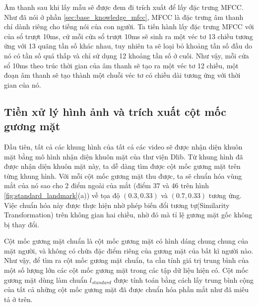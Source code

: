 Âm thanh sau khi lấy mẫu sẽ được đem đi trích xuất để lấy đặc trưng MFCC. Như đã nói ở phần \ref{sec:base_knowledge_mfcc}, MFCC là đặc trưng âm thanh chỉ dành riêng cho tiếng nói của con người. Ta tiến hành lấy đặc trưng MFCC với của sổ trượt 10ms, cứ mỗi cửa sổ trượt 10ms sẽ sinh ra một véc tơ 13 chiều tương ứng với 13 quãng tần số khác nhau, tuy nhiên ta sẽ loại bỏ khoảng tần số đầu do nó có tần số quá thấp và chỉ sử dụng 12 khoảng tần số ở cuối. Như vậy, mỗi cửa sổ 10ms theo trúc thời gian của âm thanh sẽ tạo ra một véc tơ 12 chiều, một đoạn âm thanh sẽ tạo thành một chuỗi véc tơ có chiều dài tương ứng với thời gian của nó.

\subsection{Tiền xử lý hình ảnh và trích xuất cột mốc gương mặt}\label{sec:preprocess_audio_lm}

Đầu tiên, tất cả các khung hình của tất cả các video sẽ được nhận diện khuôn mặt bằng mô hình nhận diện khuôn mặt của thư viện Dlib. Từ khung hình đã được nhận diện khuôn mặt này, ta dễ dàng tìm được cột mốc gương mặt trên từng khung hình. Với mỗi cột mốc gương mặt thu được, ta sẽ chuẩn hóa vùng mắt của nó sao cho 2 điểm ngoài của mắt (điểm 37 và 46 trên hình \ref{fig:standard_landmark}(a)) về tọa độ $(0.3, 0.33)$ và $(0.7, 0.33)$ tương ứng. Việc chuẩn hóa này được thực hiện nhờ phép biến đổi tương tự(Similarity Transformation) trên không gian hai chiều, nhờ đó mà tỉ lệ gương mặt gốc không bị thay đổi.

Cột mốc gương mặt chuẩn là cột mốc gương mặt có hình dáng chung chung của mặt người, và không có chứa đặc điểm riêng của gương mặt của bất kì người nào. Như vậy, để tìm ra cột mốc gương mặt chuẩn, ta cần tính giá trị trung bình của một số lượng lớn các cột mốc gương mặt trong các tập dữ liệu hiện có. Cột mốc gương mặt dùng làm chuẩn $l_{standard}$ được tính toán bằng cách lấy trung bình cộng của tất cả những cột mốc gương mặt đã được chuẩn hóa phần mắt như đã miêu tả ở trên.

